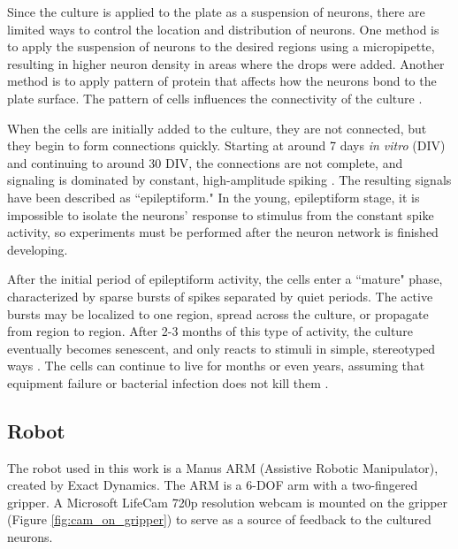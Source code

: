 \documentclass[letterpaper]{article}
\begin{document}
Since the culture is applied to the plate as a suspension of neurons, there are limited ways to control the location and distribution of neurons. 
One method is to apply the suspension of neurons to the desired regions using a micropipette, resulting in higher neuron density in areas where the drops were added. 
Another method is to apply pattern of protein that affects how the neurons bond to the plate surface.
The pattern of cells influences the connectivity of the culture \cite{sorkin2006compact}.

When the cells are initially added to the culture, they are not connected, but they begin to form connections quickly.
Starting at around 7 days \emph{in vitro} (DIV) and continuing to around 30 DIV, the connections are not complete, and signaling is dominated by constant, high-amplitude spiking \cite{warwick2010controlling}. 
The resulting signals have been described as ``epileptiform."
In the young, epileptiform stage, it is impossible to isolate the neurons' response to stimulus from the constant spike activity, so experiments must be performed after the neuron network is finished developing. 

After the initial period of epileptiform activity, the cells enter a ``mature" phase, characterized by sparse bursts of spikes separated by quiet periods. 
The active bursts may be localized to one region, spread across the culture, or propagate from region to region. 
After 2-3 months of this type of activity, the culture eventually becomes senescent, and only reacts to stimuli in simple, stereotyped ways \cite{warwick2010controlling}. 
The cells can continue to live for months or even years, assuming that equipment failure or bacterial infection does not kill them \cite{potter2001new}. 

\subsection{Robot}

The robot used in this work is a Manus ARM (Assistive Robotic Manipulator), created by Exact Dynamics.
The ARM is a 6-DOF arm with a two-fingered gripper. 
A Microsoft LifeCam 720p resolution webcam is mounted on the gripper (Figure \ref{fig:cam_on_gripper}) to serve as a source of feedback to the cultured neurons. 

\end{document}
